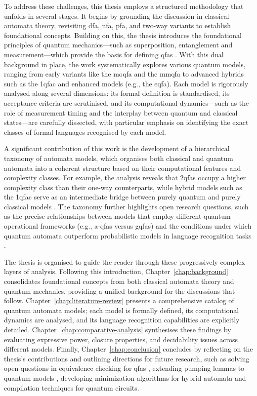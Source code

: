 To address these challenges, this thesis employs a structured methodology that unfolds in several stages. It begins by grounding the discussion in classical automata theory, revisiting \gls{dfa}, \gls{nfa}, \gls{pfa}, and two-way variants to establish foundational concepts. Building on this, the thesis introduces the foundational principles of quantum mechanics—such as superposition, entanglement and measurement—which provide the basis for defining \glspl{qfa} \cite{nielsen2010quantum}. With this dual background in place, the work systematically explores various quantum models, ranging from early variants like the \gls{moqfa} \cite{moore2000quantum} and the \gls{mmqfa} \cite{kondacs1997power} to advanced hybrids such as the \gls{1qfac} and enhanced models (e.g., the \gls{eqfa}). Each model is rigorously analysed along several dimensions: its formal definition is standardised, its acceptance criteria are scrutinised, and its computational dynamics—such as the role of measurement timing and the interplay between quantum and classical states—are carefully dissected, with particular emphasis on identifying the exact classes of formal languages recognised by each model.

A significant contribution of this work is the development of a hierarchical taxonomy of automata models, which organises both classical and quantum automata into a coherent structure based on their computational features and complexity classes. For example, the analysis reveals that \glspl{2qfa} occupy a higher complexity class than their one-way counterparts, while hybrid models such as the \gls{1qfac} serve as an intermediate bridge between purely quantum and purely classical models \cite{yakaryilmaz2010succinctness}. The taxonomy further highlights open research questions, such as the precise relationships between models that employ different quantum operational frameworks (e.g., \glspl{a-qfa} versus \glspl{gqfa}) and the conditions under which quantum automata outperform probabilistic models in language recognition tasks \cite{hirvensalo2012quantum}.

The thesis is organised to guide the reader through these progressively complex layers of analysis. Following this introduction, Chapter~\ref{chap:background} consolidates foundational concepts from both classical automata theory and quantum mechanics, providing a unified background for the discussions that follow. Chapter~\ref{chap:literature-review} presents a comprehensive catalog of quantum automata models; each model is formally defined, its computational dynamics are analysed, and its language recognition capabilities are explicitly detailed. Chapter~\ref{chap:comparative-analysis} synthesises these findings by evaluating expressive power, closure properties, and decidability issues across different models. Finally, Chapter~\ref{chap:conclusion} concludes by reflecting on the thesis’s contributions and outlining directions for future research, such as solving open questions in equivalence checking for \glspl{qfa} \cite{li2012characterizations}, extending pumping lemmas to quantum models \cite{yakaryilmaz2014quantum}, developing minimization algorithms for hybrid automata and compilation techniques for quantum circuits.

